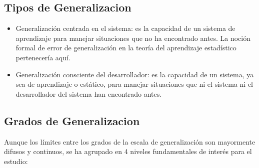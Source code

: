 \subsection*{Tipos de Generalizacion}

\begin{itemize}
\item Generalización centrada en el sistema: es la capacidad de un sistema de aprendizaje para manejar situaciones que no ha encontrado antes. La noción formal de error de generalización en la teoría del aprendizaje estadístico pertenecería aquí.

\item Generalización consciente del desarrollador: es la capacidad de un sistema, ya sea de aprendizaje o estático, para manejar situaciones que ni el sistema ni el desarrollador del sistema han encontrado antes.
\end{itemize}
\subsection*{Grados de Generalizacion}

Aunque los límites entre los grados de la escala de generalización son mayormente difusos y continuos, se ha agrupado en 4 niveles fundamentales de interés para el estudio:

